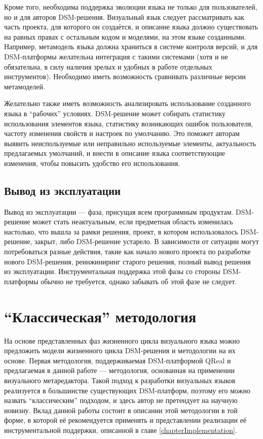 Кроме того, необходима поддержка эволюции языка не только для пользователей, но и для 
авторов DSM-решения. Визуальный язык следует рассматривать как часть проекта, для которого 
он создаётся, и описание языка должно существовать на равных правах с остальным кодом 
и моделями, на этом языке созданными. Например, метамодель языка должна храниться в 
системе контроля версий, и для DSM-платформы желательна интеграция с такими системами 
(хотя и не обязательна, в силу наличия зрелых и удобных в работе отдельных инструментов). 
Необходимо иметь возможность сравнивать различные версии метамоделей.

Желательно также иметь возможность анализировать использование созданного языка в "`рабочих"' 
условиях. DSM-решение может собирать статистику использования элементов языка, статистику 
возникающих ошибок пользователя, частоту изменения свойств и настроек по умолчанию. 
Это поможет авторам выявить неиспользуемые или неправильно используемые элементы, 
актуальность предлагаемых умолчаний, и внести в описание языка соответствующие изменения, 
чтобы повысить удобство его использования.

\subsection{Вывод из эксплуатации}
Вывод из эксплуатации --- фаза, присущая всем программным продуктам. DSM-решение может 
стать неактуальным, если предметная область изменилась настолько, что вышла за рамки 
решения, проект, в котором использовалось DSM-решение, закрыт, либо DSM-решение устарело. 
В зависимости от ситуации могут потребоваться разные действия, такие как начало нового 
проекта по разработке нового DSM-решения, реинжиниринг старого решения, полный вывод 
решения из эксплуатации. Инструментальная поддержка этой фазы со стороны DSM-платформы 
обычно не требуется, однако забывать об этой фазе не следует.

\section{"`Классическая"' методология}
\label{chapterClassicMethodology}
На основе представленных фаз жизненного цикла визуального языка можно предложить модели 
жизненного цикла DSM-решения и методологии на их основе. Первая методология, поддерживаемая 
DSM-платформой QReal и предлагаемая в данной работе --- методология, основанная на применении 
визуального метаредактора. Такой подход к разработки визуальных языков реализуется в 
большинстве существующих DSM-платформ, поэтому его можно назвать "`классическим"' подходом, 
и здесь автор не претендует на научную новизну. Вклад данной работы состоит в описании 
этой методологии в той форме, в которой её рекомендуется применять и представлении 
реализации её инструментальной поддержки, описанной в главе \ref{chapterImplementation}. 

